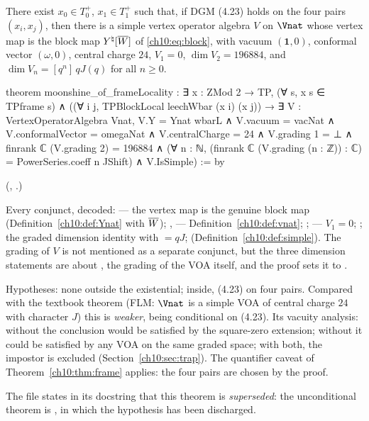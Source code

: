 \begin{theorem}\label{ch10:thm:main}
There exist $x_0\in T^+_0$, $x_1\in T^+_1$ such that, if DGM (4.23) holds on the four pairs
$(x_i,x_j)$, then there is a simple vertex operator algebra $V$ on $\Vnat$ whose vertex map is the
block map $Y^\natural[\overline{W}]$ of \eqref{ch10:eq:block}, with vacuum $(\mathbf 1,0)$, conformal
vector $(\omega,0)$, central charge $24$, $V_1=0$, $\dim V_2=196884$, and $\dim V_n=[q^n]\,qJ(q)$
for all $n\ge0$.
\end{theorem}
\begin{leancode}
theorem moonshine_of_frameLocality :
    ∃ x : ZMod 2 → TP, (∀ s, x s ∈ TPframe s) ∧
      ((∀ i j, TPBlockLocal leechWbar (x i) (x j)) →
        ∃ V : VertexOperatorAlgebra Vnat,
          V.Y = Ynat wbarL ∧ V.vacuum = vacNat ∧ V.conformalVector = omegaNat ∧
          V.centralCharge = 24 ∧
          V.grading 1 = ⊥ ∧
          finrank ℂ (V.grading 2) = 196884 ∧
          (∀ n : ℕ, (finrank ℂ (V.grading (n : ℤ)) : ℂ) = PowerSeries.coeff n JShift) ∧
          V.IsSimple) := by
\end{leancode}
(, .)
\begin{dictionary}
Every conjunct, decoded:
 --- the vertex map is the genuine block map (Definition~\ref{ch10:def:Ynat}
with $\overline{W}$); ,  ---
Definition~\ref{ch10:def:vnat}; ;  --- $V_1=0$;
; the graded dimension identity with  $=qJ$;
 (Definition~\ref{ch10:def:simple}).  The grading of $V$ is not mentioned as a
separate conjunct, but the three dimension statements are about , the grading of
the VOA itself, and the proof sets it to .

Hypotheses: none outside the existential; inside, (4.23) on four pairs.  Compared with the
textbook theorem (FLM: $\Vnat$ is a simple VOA of central charge $24$ with character $J$) this is
\emph{weaker}, being conditional on (4.23).  Its vacuity analysis: without  the
conclusion would be satisfied by the square-zero extension; without  it
could be satisfied by any VOA on the same graded space; with both, the impostor is excluded
(Section~\ref{ch10:sec:trap}).  The quantifier caveat of Theorem~\ref{ch10:thm:frame} applies:
the four pairs are chosen by the proof.

The file  states in its docstring that this theorem is \emph{superseded}: the
unconditional theorem is , in which the hypothesis has been
discharged.
\end{dictionary}

